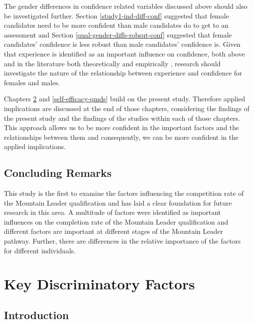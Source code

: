 \documentclass[
  12pt,
  a4paper,
]{book}
\begin{document}
The gender differences in confidence related variables discussed above should also be investigated further. Section \ref{study1-ind-diff-conf} suggested that female candidates need to be more confident than male candidates do to get to an assessment and Section \ref{qual-gender-diffs-robsut-conf} suggested that female candidates' confidence is less robust than male candidates' confidence is. Given that experience is identified as an important influence on confidence, both above and in the literature both theoretically \citep[, \citet{Bandura1982}]{e.g} and empirically \citep[, \citet{McAuley2006}]{e.g}, research should investigate the nature of the relationship between experience and confidence for females and males.

Chapters \ref{ml-pra} and \ref{self-efficacy-qmds} build on the present study. Therefore applied implications are discussed at the end of those chapters, considering the findings of the present study and the findings of the studies within each of those chapters. This approach allows us to be more confident in the important factors and the relationships between them and consequently, we can be more confident in the applied implications.

\hypertarget{qual-concluding-remarks}{%
\section{Concluding Remarks}\label{qual-concluding-remarks}}

This study is the first to examine the factors influencing the competition rate of the Mountain Leader qualification and has laid a clear foundation for future research in this area. A multitude of factors were identified as important influences on the completion rate of the Mountain Leader qualification and different factors are important at different stages of the Mountain Leader pathway. Further, there are differences in the relative importance of the factors for different individuals.

\hypertarget{ml-pra}{%
\chapter{Key Discriminatory Factors}\label{ml-pra}}

\hypertarget{pra-introduction}{%
\section{Introduction}\label{pra-introduction}}
\end{document}
